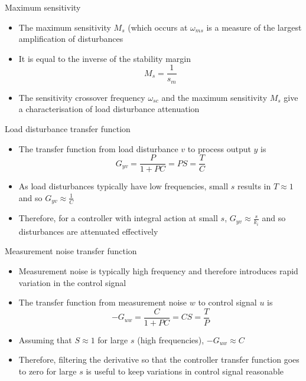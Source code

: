 \documentclass{beamer-control}
\begin{document}
\begin{frame}{Maximum sensitivity}
\begin{itemize}
	\item The maximum sensitivity $M_s$ (which occurs at $\omega_{ms}$ is a measure of the largest amplification of disturbances
	\item It is equal to the inverse of the stability margin
	\[M_s=\frac{1}{s_m}\]
	\item The sensitivity crossover frequency $\omega_{sc}$ and the maximum sensitivity $M_s$ give a characterisation of load disturbance attenuation
\end{itemize}
\end{frame}

\begin{frame}{Load disturbance transfer function}
	\begin{itemize}
		\item The transfer function from load disturbance $v$ to process output $y$ is 
		\[G_{yv} = \frac{P}{1+PC}=PS=\frac{T}{C}\]
		\item As load disturbances typically have low frequencies, small $s$ results in $T\approx1$ and so $G_{yv}\approx \frac{1}{C}$
		\item Therefore, for a controller with integral action at small $s$, $G_{yv}\approx \frac{s}{k_i}$ and so disturbances are attenuated effectively
		
	\end{itemize}
\end{frame}

\begin{frame}{Measurement noise transfer function}
	\begin{itemize}
		\item Measurement noise is typically high frequency and therefore introduces rapid variation in the control signal
		\item The transfer function from measurement noise $w$ to control signal $u$ is 
		\[-G_{uw} = \frac{C}{1+PC}=CS=\frac{T}{P}\]
		\item Assuming that $S\approx 1$ for large $s$ (high frequencies), $-G_{uw}\approx C$
		\item Therefore, filtering the derivative so that the controller transfer function goes to zero for large $s$ is useful to keep variations in control signal reasonable
		
	\end{itemize}
\end{frame}


\SUMMARYFRAME
\FINALE
\end{document}
